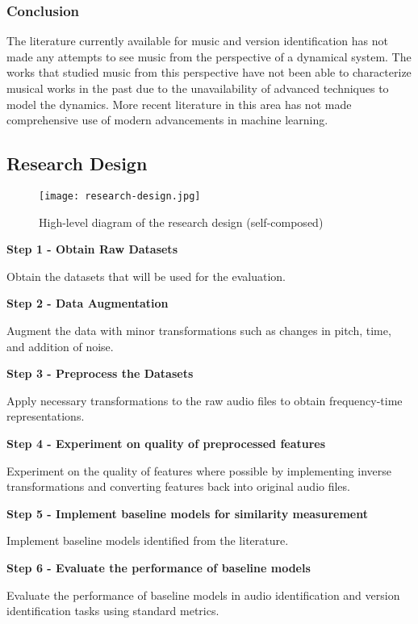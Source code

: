 \documentclass[../main.tex]{subfiles}
\begin{document}
\subsubsection{Conclusion}
\par
The literature currently available for music and version identification has not made any attempts to see music from the perspective of a dynamical system. The works that studied music from this perspective have not been able to characterize musical works in the past due to the unavailability of advanced techniques to model the dynamics. More recent literature in this area has not made comprehensive use of modern advancements in machine learning.

\subsection{Research Design}

\begin{figure}[H]
    \centering
    \texttt{[image: research-design.jpg]}
    \caption{High-level diagram of the research design (self-composed)}
    \label{fig:research-design}
\end{figure}

\textbf{Step 1 - Obtain Raw Datasets}
\par
Obtain the datasets that will be used for the evaluation.

\textbf{Step 2 - Data Augmentation}
\par
Augment the data with minor transformations such as changes in pitch, time, and addition of noise.

\textbf{Step 3 - Preprocess the Datasets}
\par
Apply necessary transformations to the raw audio files to obtain frequency-time representations.

\textbf{Step 4 - Experiment on quality of preprocessed features}
\par
Experiment on the quality of features where possible by implementing inverse transformations and converting features back into original audio files.

\textbf{Step 5 - Implement baseline models for similarity measurement}
\nopagebreak
\par
Implement baseline models identified from the literature.

\textbf{Step 6 - Evaluate the performance of baseline models}
\par
Evaluate the performance of baseline models in audio identification and version identification tasks using standard metrics.
\end{document}
